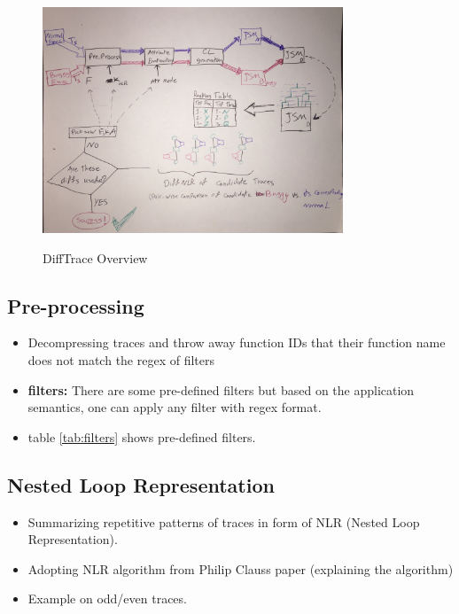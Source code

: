 \begin{figure}[]
\caption{DiffTrace Overview}
\includegraphics[width=0.8\textwidth]{figs/diffTraceOverview.jpg}
\label{fig.diffTraceOverview}
\end{figure}


\subsection{Pre-processing}

\begin{itemize}
	\item Decompressing traces and throw away function IDs that
their function name does not match the regex of filters
	\item \textbf{filters:} There are some pre-defined filters but based on
the application semantics, one can apply any filter with
regex format.
	\item table \ref{tab:filters} shows pre-defined filters.
\end{itemize}




\subsection{Nested Loop Representation}

\begin{itemize}
	\item Summarizing repetitive patterns of traces in form of NLR
(Nested Loop Representation).
	\item Adopting NLR algorithm from Philip Clauss paper (explaining
the algorithm)
	\item Example on odd/even traces.
\end{itemize}

